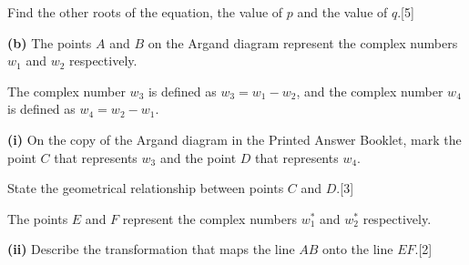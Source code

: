 \documentclass[a4paper,11pt,oneside]{article}
\newcommand{\partlabel}[1]{\par\needspace{3\baselineskip}\smallskip\noindent\textbf{#1}\quad}
\newcommand{\mk}[1]{\hfill[#1]}
\begin{document}
Find the other roots of the equation, the value of $p$ and the value of $q$.\mk{5}
\partlabel{(b)}
The points $A$ and $B$ on the Argand diagram represent the complex numbers $w_1$ and $w_2$ respectively.
\begin{center}
\end{center}
The complex number $w_3$ is defined as $w_3=w_1-w_2$, and the complex number $w_4$ is defined as $w_4=w_2-w_1$.
\partlabel{(i)}
On the copy of the Argand diagram in the Printed Answer Booklet, mark the point $C$ that represents $w_3$ and the point $D$ that represents $w_4$.

State the geometrical relationship between points $C$ and $D$.\mk{3}

The points $E$ and $F$ represent the complex numbers $w_1^*$ and $w_2^*$ respectively.
\partlabel{(ii)}
Describe the transformation that maps the line $AB$ onto the line $EF$.\mk{2}
\end{document}
